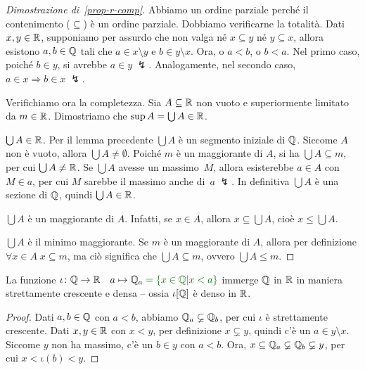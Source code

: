 \begin{proof}[Dimostrazione di~\ref{prop-r-comp}]
	Abbiamo un ordine parziale perch\'e il contenimento ($\subseteq$)
\`e un ordine parziale. Dobbiamo verificarne la totalit\`a.
	Dati $x,y \in \mathbb R$, supponiamo per assurdo che non valga n\'e $x \subseteq y$ n\'e $y \subseteq x$, allora esistono $a,b \in \mathbb Q$ tali che $a \in x \setminus y$ e $b \in y \setminus x$.
	Ora, o $a < b$, o $b < a$.
	Nel primo caso, poich\'e $b \in y$, si avrebbe $a \in y
\;\lightning$. Analogamente, nel secondo caso, $a\in x \Rightarrow b \in x \; \lightning$.

	Verifichiamo ora la completezza. Sia $A \subseteq \mathbb R$ non vuoto e
superiormente limitato da $m \in \mathbb R$. Dimostriamo che $\sup A = \bigcup A \in \mathbb R$.

{\drkblu $\bigcup A \in \mathbb R$.}	Per il lemma precedente $\bigcup A$ \`e un segmento iniziale di
$\mathbb Q$. Siccome $A$ non \`e vuoto, allora $\bigcup A \ne \emptyset$. Poich\'e $m$ \`e un maggiorante di $A$,
	si ha $\bigcup A \subseteq m$, per cui $\bigcup A \ne \mathbb R$. Se
$\bigcup A$ avesse un massimo~$M$, allora esisterebbe $a\in A$ con $M\in
a$, per cui $M$ sarebbe il massimo anche di~$a\;\lightning$. In definitiva
$\bigcup A$ \`e una sezione di $\mathbb Q$, quindi $\bigcup A \in \mathbb R$.

{\drkblu $\bigcup A$ \`e un maggiorante di $A$.} Infatti, se $x \in A$,
allora $x \subseteq \bigcup A$, cio\`e $x\le\bigcup A$.

{\drkblu $\bigcup A$ \`e il minimo maggiorante.}
	Se $m$ \`e un maggiorante di $A$, allora per definizione $\forall
{x \in A} \; x \subseteq m$, ma ci\`o significa che $\bigcup A \subseteq
m$, ovvero $\bigcup A \le m$.
\end{proof}

\begin{remark}
	La funzione $\iota \colon \QQ \to \RR \quad a \mapsto \QQ_a
\drkgrn = \{x \in \QQ | x < a\}$
	immerge $\mathbb Q$ in $\mathbb R$ in maniera strettamente crescente e densa
-- ossia $\iota[\mathbb Q]$ \`e denso in $\mathbb R$.
\end{remark}

\begin{proof}
	Dati $a,b \in \mathbb Q$ con $a < b$, abbiamo $\mathbb Q_a \varsubsetneq \mathbb Q_b$,
per cui $\iota$ \`e strettamente crescente. Dati $x,y \in \mathbb R$ con $x <
y$, per definizione $x \subsetneq y$, quindi c'\`e un $a \in y \setminus
x$. Siccome $y$ non ha massimo, c'\`e un $b\in y$ con $a<b$. Ora,
$x\subseteq \mathbb Q_a \varsubsetneq \mathbb Q_b \varsubsetneq y$, per cui $x<\iota(b)<y$.
\end{proof}

